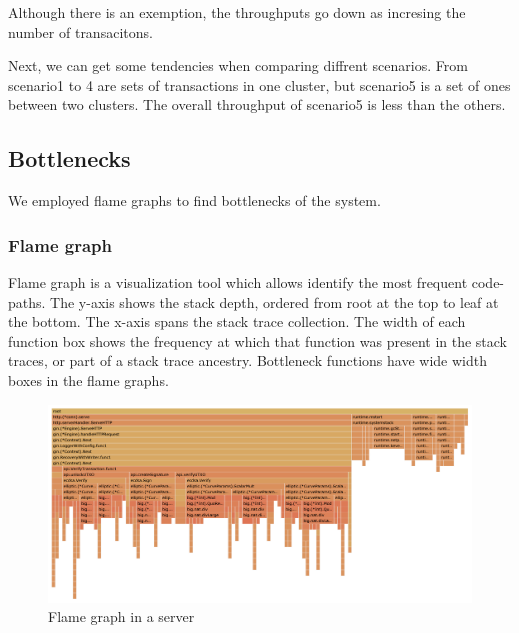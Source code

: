 \documentclass[a4paper, oneside]{discothesis}
\begin{document}
Although there is an exemption, the throughputs go down as incresing
the number of transacitons.

Next, we can get some tendencies when comparing diffrent scenarios.
From scenario1 to 4 are sets of transactions in one cluster,
but scenario5 is a set of ones between two clusters.
The overall throughput of scenario5 is less than the others.



\subsection{Bottlenecks}
We employed flame graphs to find bottlenecks of the system.

\subsubsection{Flame graph}
Flame graph is a visualization tool which allows identify the most frequent code-paths.
The y-axis shows the stack depth, ordered from root at the top to leaf at the bottom.
The x-axis spans the stack trace collection.
The width of each function box shows the frequency at which that function was present
in the stack traces, or part of a stack trace ancestry.
Bottleneck functions have wide width boxes in the flame graphs.


\begin{figure}
    \begin{center}
        \includegraphics[width=\columnwidth]{figures/server_flame_graph}
        \caption{Flame graph in a server}
        \label{fig:server-fg}
    \end{center}
\end{figure}
\end{document}
